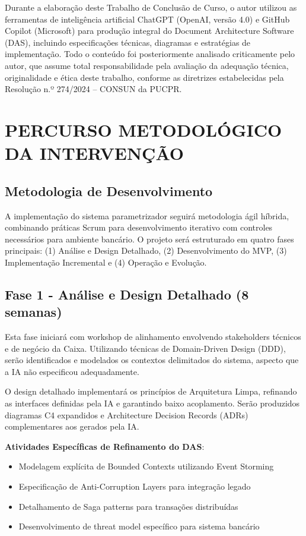Durante a elaboração deste Trabalho de Conclusão de Curso, o autor utilizou as ferramentas de inteligência artificial ChatGPT (OpenAI, versão 4.0) e GitHub Copilot (Microsoft) para produção integral do Document Architecture Software (DAS), incluindo especificações técnicas, diagramas e estratégias de implementação. Todo o conteúdo foi posteriormente analisado criticamente pelo autor, que assume total responsabilidade pela avaliação da adequação técnica, originalidade e ética deste trabalho, conforme as diretrizes estabelecidas pela Resolução n.º 274/2024 – CONSUN da PUCPR.

\chapter{PERCURSO METODOLÓGICO DA INTERVENÇÃO}

\section{Metodologia de Desenvolvimento}

A implementação do sistema parametrizador seguirá metodologia ágil híbrida, combinando práticas Scrum para desenvolvimento iterativo com controles necessários para ambiente bancário. O projeto será estruturado em quatro fases principais: (1) Análise e Design Detalhado, (2) Desenvolvimento do MVP, (3) Implementação Incremental e (4) Operação e Evolução.

\section{Fase 1 - Análise e Design Detalhado (8 semanas)}

Esta fase iniciará com workshop de alinhamento envolvendo stakeholders técnicos e de negócio da Caixa. Utilizando técnicas de Domain-Driven Design (DDD), serão identificados e modelados os contextos delimitados do sistema, aspecto que a IA não especificou adequadamente.

O design detalhado implementará os princípios de Arquitetura Limpa, refinando as interfaces definidas pela IA e garantindo baixo acoplamento. Serão produzidos diagramas C4 expandidos e Architecture Decision Records (ADRs) complementares aos gerados pela IA.

\textbf{Atividades Específicas de Refinamento do DAS}:
\begin{itemize}
\item Modelagem explícita de Bounded Contexts utilizando Event Storming
\item Especificação de Anti-Corruption Layers para integração legado
\item Detalhamento de Saga patterns para transações distribuídas
\item Desenvolvimento de threat model específico para sistema bancário
\end{itemize}

